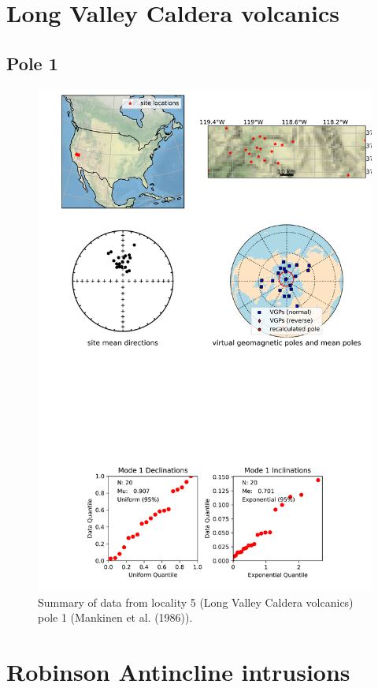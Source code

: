 \documentclass{article}
\begin{document}
\section{Long Valley Caldera volcanics}
\subsection{Pole 1}


\begin{figure}[H]
\centering
\includegraphics[width=5 in]{./5/1/pole_summary.png}
\caption{Summary of data from locality 5 (Long Valley Caldera volcanics) pole 1 (Mankinen et al. (1986)).}
\end{figure}

\section{Robinson Antincline intrusions}
\end{document}
